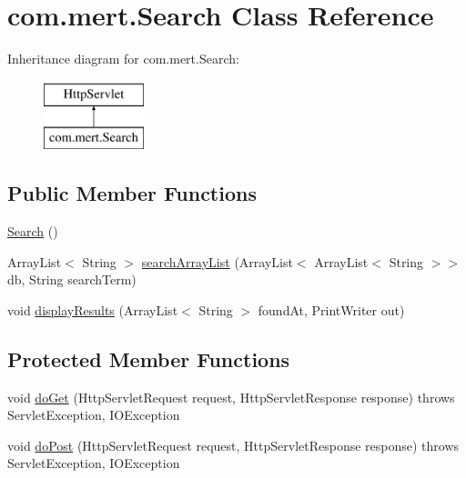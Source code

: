 \hypertarget{classcom_1_1mert_1_1_search}{}\section{com.\+mert.\+Search Class Reference}
\label{classcom_1_1mert_1_1_search}
Inheritance diagram for com.\+mert.\+Search\+:\begin{figure}[H]
\begin{center}
\leavevmode
\includegraphics[height=2.000000cm]{classcom_1_1mert_1_1_search}
\end{center}
\end{figure}
\subsection*{Public Member Functions}
\begin{DoxyCompactItemize}
\item 
\hyperlink{classcom_1_1mert_1_1_search_adb57f5c1f90037b37445e6caddbae989}{Search} ()
\item 
Array\+List$<$ String $>$ \hyperlink{classcom_1_1mert_1_1_search_a07fd75951344d799a0b03eff2a3d7711}{search\+Array\+List} (Array\+List$<$ Array\+List$<$ String $>$$>$ db, String search\+Term)
\item 
void \hyperlink{classcom_1_1mert_1_1_search_a4c940ac4695b377b89cb90ec5a9909a5}{display\+Results} (Array\+List$<$ String $>$ found\+At, Print\+Writer out)
\end{DoxyCompactItemize}
\subsection*{Protected Member Functions}
\begin{DoxyCompactItemize}
\item 
void \hyperlink{classcom_1_1mert_1_1_search_a28593c1902aa8b54f267384d666744d1}{do\+Get} (Http\+Servlet\+Request request, Http\+Servlet\+Response response)  throws Servlet\+Exception, I\+O\+Exception 
\item 
void \hyperlink{classcom_1_1mert_1_1_search_a83f297bcd977985a9f999ae6212168bd}{do\+Post} (Http\+Servlet\+Request request, Http\+Servlet\+Response response)  throws Servlet\+Exception, I\+O\+Exception 
\end{DoxyCompactItemize}


